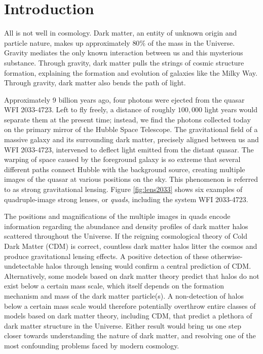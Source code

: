 
%
%

\chapter{Introduction}

\indent All is not well in cosmology. Dark matter, an entity of unknown origin and particle nature, makes up approximately $80\%$ of the mass in the Universe. Gravity mediates the only known interaction between us and this mysterious substance. Through gravity, dark matter pulls the strings of cosmic structure formation, explaining the formation and evolution of galaxies like the Milky Way. Through gravity, dark matter also bends the path of light. 

Approximately 9 billion years ago, four photons were ejected from the quasar WFI 2033-4723. Left to fly freely, a distance of roughly $100,000$ light years would separate them at the present time; instead, we find the photons collected today on the primary mirror of the Hubble Space Telescope. The gravitational field of a massive galaxy and its surrounding dark matter, precisely aligned between us and WFI 2033-4723, intervened to deflect light emitted from the distant quasar. The warping of space caused by the foreground galaxy is so extreme that several different paths connect Hubble with the background source, creating multiple images of the quasar at various positions on the sky. This phenomenon is referred to as strong gravitational lensing. Figure \ref{fig:lens2033} shows six examples of quadruple-image strong lenses, or \textit{quads}, including the system WFI 2033-4723.

The positions and magnifications of the multiple images in quads encode information regarding the abundance and density profiles of dark matter halos scattered throughout the Universe. If the reigning cosmological theory of Cold Dark Matter (CDM) is correct, countless dark matter halos litter the cosmos and produce gravitational lensing effects. A positive detection of these otherwise-undetectable halos through lensing would confirm a central prediction of CDM. Alternatively, some models based on dark matter theory predict that halos do not exist below a certain mass scale, which itself depends on the formation mechanism and mass of the dark matter particle(s). A non-detection of halos below a certain mass scale would therefore potentially overthrow entire classes of models based on dark matter theory, including CDM, that predict a plethora of dark matter structure in the Universe. Either result would bring us one step closer towards understanding the nature of dark matter, and resolving one of the most confounding problems faced by modern cosmology. 

